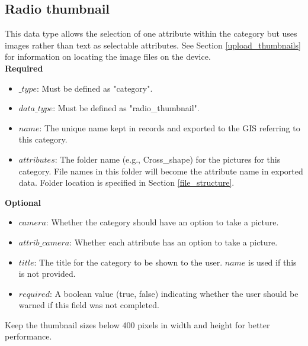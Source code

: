 \documentclass{scrreprt}
\begin{document}
\subsection{Radio thumbnail}
This data type allows the selection of one attribute within the category but uses images rather than text as selectable attributes. See Section \ref{upload_thumbnails} for information on locating the image files on the device.\\
\textbf{Required}
\begin{itemize}
\item $\_type$:  Must be defined as "category".
\item $data\_type$: Must be defined as "radio_thumbnail".
\item $name$: The unique name kept in records and exported to the GIS referring to this category.
\item $attributes$: The folder name (e.g., Cross_shape) for the pictures for this category. File names in this folder will become the attribute name in exported data. Folder location is specified in Section \ref{file_structure}.
\end{itemize}
\textbf{Optional}
\begin{itemize}
\item $camera$: Whether the category should have an option to take a picture.
\item $attrib\_camera$: Whether each attribute has an option to take a picture.
\item $title$: The title for the category to be shown to the user. $name$ is used if this is not provided.
\item $required$: A boolean value (true, false) indicating whether the user should be warned if this field was not completed.
\end{itemize}
Keep the thumbnail sizes below 400 pixels in width and height for better performance.


\newpage
\end{document}
